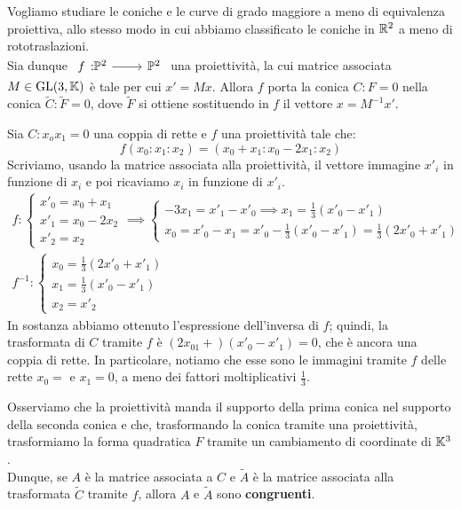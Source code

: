 Vogliamo studiare le coniche e le curve di grado maggiore a meno di equivalenza proiettiva, allo stesso modo in cui abbiamo classificato le coniche in $\mathbb{R}^2$ a meno di rototraslazioni.\\
Sia dunque $\funz f {\proj[2]{\ }} {\proj[2]{\ }}$ una proiettività, la cui matrice associata $M\in\operatorname{GL}(3,\mathbb{K})$ è tale per cui $x'=Mx$. Allora $f$ porta la conica $C\colon F=0$ nella conica $\widetilde{C}\colon \widetilde{F}=0$, dove $\widetilde{F}$ si ottiene sostituendo in $f$ il vettore $x=M^{-1}x'$.
\begin{example}
Sia $C \colon x_ox_1=0$ una coppia di rette e $f$ una proiettività tale che:
\begin{equation*}
	f(x_0\colon x_1\colon x_2)=(x_0+x_1\colon x_0-2x_1\colon x_2)
\end{equation*}
Scriviamo, usando la matrice associata alla proiettività, il vettore immagine $x'_i$ in funzione di $x_i$ e poi ricaviamo $x_i$ in funzione di $x'_i$.
\begin{gather*}
f\colon \begin{cases}
x'_0=x_0+x_1\\
x'_1=x_0-2x_2\\
x'_2=x_2
\end{cases} \implies \begin{cases}
-3x_1=x'_1-x'_0 \implies x_1=\frac{1}{3}(x'_0-x'_1)\\
x_0=x'_0-x_1=x'_0 -\frac{1}{3}(x'_0-x'_1)=\frac{1}{3}(2x'_0+x'_1)
\end{cases}\\
f^{-1}\colon \begin{cases}
x_0=\frac{1}{3}(2x'_0+x'_1)\\
x_1=\frac{1}{3}(x'_0-x'_1)\\
x_2=x'_2
\end{cases}
\end{gather*}
In sostanza abbiamo ottenuto l'espressione dell'inversa di $f$; quindi, la trasformata di $C$ tramite $f$ è $(2x_01+)(x'_0-x'_1)=0$, che è ancora una coppia di rette. In particolare, notiamo che esse sono le immagini tramite $f$ delle rette $x_0=$ e $x_1=0$, a meno dei fattori moltiplicativi $\frac{1}{3}$.
\end{example}
Osserviamo che la proiettività manda il supporto della prima conica nel supporto della seconda conica e che, trasformando la conica tramite una proiettività, trasformiamo la forma quadratica $F$ tramite un cambiamento di coordinate di $\mathbb{K}^3$.\\
Dunque, se $A$ è la matrice associata a $C$ e $\widetilde{A}$ è la matrice associata alla trasformata $\widetilde{C}$ tramite $f$, allora $A$ e $\widetilde{A}$ sono \textbf{congruenti}.
